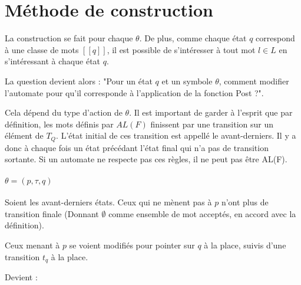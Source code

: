 \section{Méthode de construction}

La construction se fait pour chaque $\theta$. De plus, comme chaque état $q$ correspond à une classe de mots $[[q]]$, il est possible de s'intéresser à tout mot $l\in L$ en s'intéressant à chaque état $q$.

La question devient alors : "Pour un état $q$ et un symbole $\theta$, comment modifier l'automate pour qu'il corresponde à l'application de la fonction Post ?".

Cela dépend du type d'action de $\theta$.
Il est important de garder à l'esprit que par définition, les mots définis par $AL(F)$ finissent par une transition sur un élément de $T_Q$. 
L'état initial de ces transition est appellé le avant-derniers. 
Il y a donc à chaque fois un état précédant l'état final qui n'a pas de transition sortante.
Si un automate ne respecte pas ces règles, il ne peut pas être AL(F).

\paragraph{$\theta=(p, \tau, q)$}

Soient les avant-derniers états. Ceux qui ne mènent pas à $p$ n'ont plus de transition finale (Donnant $\emptyset$ comme ensemble de mot acceptés, en accord avec la définition).

Ceux menant à $p$ se voient modifiés pour pointer sur $q$ à la place, suivis d'une transition $t_q$ à la place.


\begin{figure}[H]
    \centering
\end{figure}

Devient :

\begin{figure}[H]
    \centering
\end{figure}


